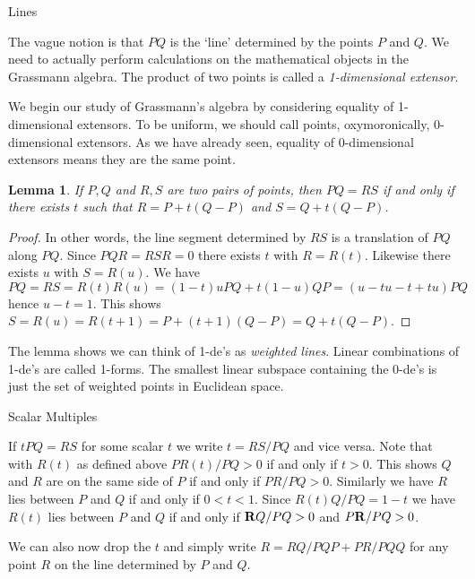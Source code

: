 \documentclass[fleqn]{amsart}
\newtheorem{lemma}[theorem]{Lemma}
\begin{document}
\begin{section}{Lines}

The vague notion is that $PQ$ is the `line' determined by the points $P$
and $Q$. We need to actually perform calculations on the mathematical
objects in the Grassmann algebra. The product of
two points is called a {\em 1-dimensional extensor}.

We begin our study of Grassmann's algebra by considering equality
of 1-dimensional extensors. To be uniform, we should call
points, oxymoronically, 0-dimensional extensors. As we have
already seen, equality of 0-dimensional extensors means
they are the same point.

\begin{lemma}
If $P,Q$ and $R,S$ are two pairs of points, then
$PQ = RS$ if and only if there exists $t$ such
that $R = P + t(Q - P)$ and $S = Q + t(Q - P)$.
\end{lemma}

\begin{proof}
In other words, the line segment determined by $RS$ is a
translation of $PQ$ along $PQ$. Since $PQR = RSR = 0$
there exists $t$ with $R = R(t)$.  Likewise there exists
$u$ with $S = R(u)$. We have $PQ = RS = R(t)R(u)
= (1 - t)uPQ + t(1 - u)QP = (u - tu - t + tu)PQ$ hence
$u - t = 1$.  This shows $S = R(u) = R(t + 1)
= P + (t + 1)(Q - P) = Q + t(Q - P)$.

\end{proof}

The lemma shows we can think of 1-de's as {\em weighted lines}.
Linear combinations of 1-de's are called 1-forms. The smallest linear
subspace containing the 0-de's is just the set of weighted points in
Euclidean space.

\begin{subsection}{Scalar Multiples}

If $tPQ = RS$ for some scalar $t$ we write $t = RS/PQ$ and vice
versa. Note that with $R(t)$ as defined above $PR(t)/PQ > 0$ if and only
if $t > 0$. This shows $Q$ and $R$ are on the same side of $P$
if and only if $PR/PQ > 0$. Similarly we have $R$ lies between
$P$ and $Q$ if and only if $0 < t < 1$. Since
$R(t)Q/PQ = 1 - t$ we have $R(t)$ lies between $P$ and $Q$
if and only if ${\bf R}Q/PQ > 0$ and $P{\bf R}/PQ > 0$.

We can also now drop the $t$ and simply write
$R = RQ/PQ P + PR/PQ Q$ for any point $R$ on the line
determined by $P$ and $Q$.

\end{subsection}


\end{section}
\end{document}

